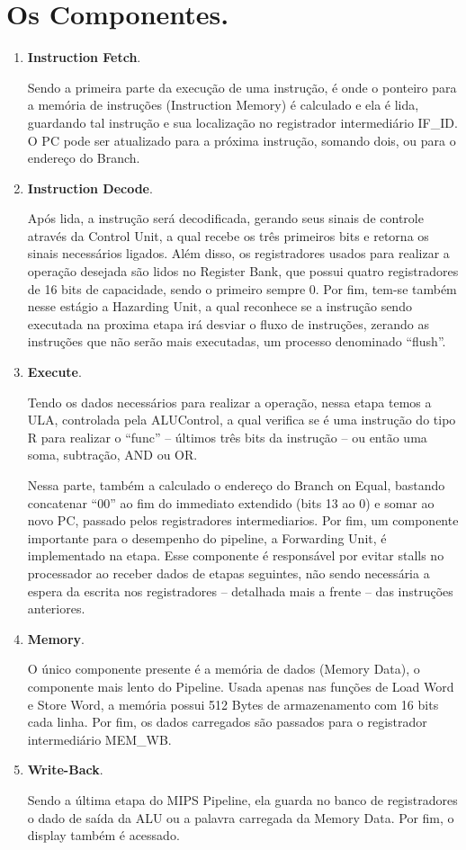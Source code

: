 \documentclass[a4paper, 11pt]{article}
\begin{document}
\section{Os Componentes.}
\begin{enumerate}
    \item \textbf{Instruction Fetch}.

    Sendo a primeira parte da execução de uma instrução, é onde o ponteiro para a
    memória de instruções (Instruction Memory) é calculado e ela é lida, guardando tal instrução e sua localização no registrador intermediário IF\_ID. O PC pode ser atualizado para a próxima instrução, somando dois, ou para o endereço do Branch.

    \item \textbf{Instruction Decode}.

    Após lida, a instrução será decodificada, gerando seus sinais de controle através
    da Control Unit, a qual recebe os três primeiros bits e retorna os sinais necessários
    ligados. Além disso, os registradores usados para realizar a operação desejada são
    lidos no Register Bank, que possui quatro registradores de 16 bits de capacidade,
    sendo o primeiro sempre 0. Por fim, tem-se também nesse estágio a Hazarding Unit,
    a qual reconhece se a instrução sendo executada na proxima etapa irá desviar o fluxo
    de instruções, zerando as instruções que não serão mais executadas, um processo
    denominado “flush”.

    \item \textbf{Execute}.

    Tendo os dados necessários para realizar a operação, nessa etapa temos a ULA,
    controlada pela ALUControl, a qual verifica se é uma instrução do tipo R para
    realizar o “func” – últimos três bits da instrução – ou então uma soma,
    subtração, AND ou OR.

    Nessa parte, também a calculado o endereço do Branch on Equal,  bastando concatenar
    “00” ao fim do immediato extendido (bits 13 ao 0) e somar ao novo PC, passado pelos
    registradores intermediarios. Por fim, um componente importante para o desempenho do
    pipeline, a Forwarding Unit, é implementado na etapa. Esse componente é responsável
    por evitar stalls no processador ao receber dados de etapas seguintes, não sendo
    necessária a espera da escrita nos registradores – detalhada mais a frente – das
    instruções anteriores.

    \item \textbf{Memory}.

    O único componente presente é a memória de dados (Memory Data), o componente mais
    lento do Pipeline. Usada apenas nas funções de Load Word e Store Word, a memória
    possui 512 Bytes de armazenamento com 16 bits cada linha. Por fim, os dados carregados
    são passados para o registrador intermediário MEM\_WB.
    
    \item \textbf{Write-Back}.

    Sendo a última etapa do MIPS Pipeline, ela guarda no banco de registradores o
    dado de saída da ALU ou a palavra carregada da Memory Data. Por fim, o display também é acessado.
\end{enumerate}
\end{document}
